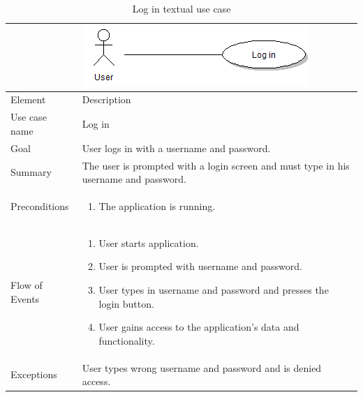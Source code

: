 \begin{table}
\begin{tabular}{p{3cm}p{12cm}}
& \includegraphics{login}\\ \hline
Element & Description \\ \hline
Use case name & Log in \\
Goal & User logs in with a username and password. \\
Summary &The user is prompted with a login screen and must type in his username and password. \\
Preconditions &
\begin{enumerate}
\item{}The application is running.
\end{enumerate} \\ \hline
Flow of Events &
\begin{enumerate}
\item{}User starts application.
\item{}User is prompted with username and password.
\item{}User types in username and password and presses the login button.
\item{}User gains access to the application’s data and functionality.
\end{enumerate} \\ \hline
Exceptions & User types wrong username and password and is denied access.
\end{tabular}
\caption{Log in textual use case} \label{tab:login}
\end{table}

